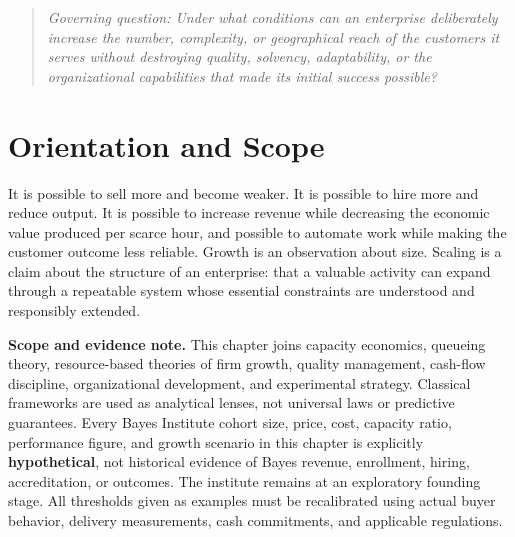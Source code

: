 
\begin{quote}
\textit{Governing question: Under what conditions can an enterprise deliberately increase the number, complexity, or geographical reach of the customers it serves without destroying quality, solvency, adaptability, or the organizational capabilities that made its initial success possible?}
\end{quote}

\vspace{1.5pt}

\section*{Orientation and Scope}

It is possible to sell more and become weaker. It is possible to hire more and reduce output. It is possible to increase revenue while decreasing the economic value produced per scarce hour, and possible to automate work while making the customer outcome less reliable. Growth is an observation about size. Scaling is a claim about the structure of an enterprise: that a valuable activity can expand through a repeatable system whose essential constraints are understood and responsibly extended.

\textbf{Scope and evidence note.} This chapter joins capacity economics, queueing theory, resource-based theories of firm growth, quality management, cash-flow discipline, organizational development, and experimental strategy. Classical frameworks are used as analytical lenses, not universal laws or predictive guarantees. Every Bayes Institute cohort size, price, cost, capacity ratio, performance figure, and growth scenario in this chapter is explicitly \textbf{hypothetical}, not historical evidence of Bayes revenue, enrollment, hiring, accreditation, or outcomes. The institute remains at an exploratory founding stage. All thresholds given as examples must be recalibrated using actual buyer behavior, delivery measurements, cash commitments, and applicable regulations.

